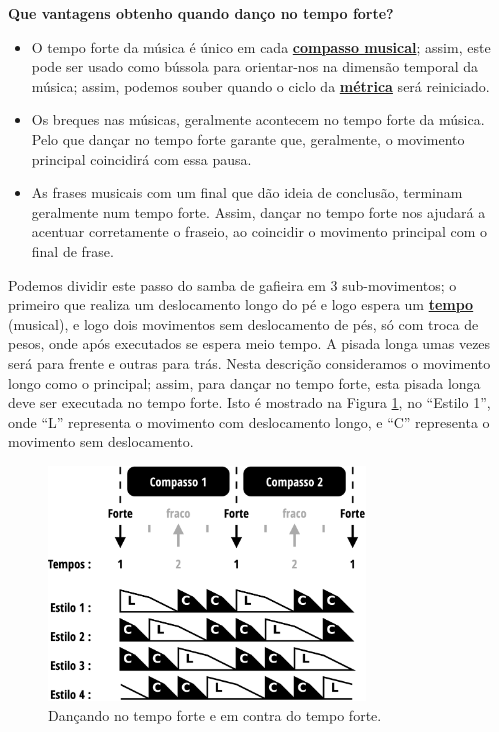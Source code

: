 \begin{tcbinformation} 
\label{ref:beneficiosdancarforte}
\textbf{Que vantagens obtenho quando danço no tempo forte?}
\begin{itemize}
\item O tempo forte da música é único em cada \hyperref[sec:compaso]{\textbf{compasso musical}};
assim, este pode ser usado como bússola para orientar-nos na dimensão temporal da música; assim,
podemos souber quando o ciclo da \hyperref[def:Metrica]{\textbf{métrica}} será reiniciado.
\item Os breques nas músicas, geralmente acontecem no tempo forte da música.
Pelo que dançar no tempo forte garante que, geralmente, 
o movimento principal coincidirá com essa pausa.
\item As frases musicais com um final que dão ideia de conclusão,
terminam geralmente num tempo forte.
Assim, dançar no tempo forte nos ajudará a acentuar corretamente o fraseio,
ao coincidir o movimento principal com o final de frase. 
\end{itemize}
\end{tcbinformation} 

\begin{example}
\label{ex:frentetrasex}
Podemos dividir este passo do samba de gafieira em 3 sub-movimentos; 
o primeiro que realiza um deslocamento longo do pé e logo espera um \hyperref[sec:Tempo]{\textbf{tempo}} (musical),
e logo dois movimentos sem deslocamento de pés, só com troca de pesos,
 onde após executados se espera meio tempo. 
A pisada longa umas vezes será para frente e outras para trás. 
Nesta descrição consideramos o movimento longo como o principal;
assim, para dançar no tempo forte, esta pisada longa deve ser executada no tempo forte.
Isto é mostrado na Figura \ref{fig:tempovscontratempo}, no ``Estilo 1'',
onde ``L'' representa o movimento com deslocamento longo,
e ``C'' representa o movimento sem deslocamento.
\end{example}


\begin{figure}[h]
    \centering 
\includegraphics[width=0.75\textwidth]{chapters/cap-musicalidade/bailarcontratempo.eps}
    \caption{Dançando no tempo forte e em contra do tempo forte.}\label{fig:tempovscontratempo}
\end{figure}





